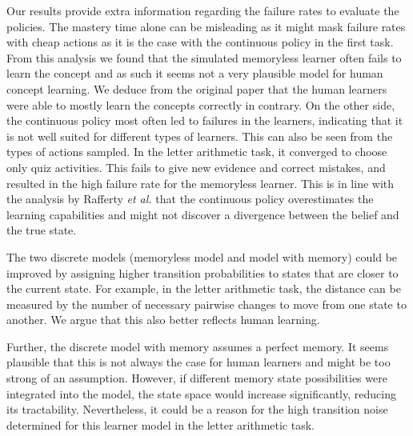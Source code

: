 Our results provide extra information regarding the failure rates to evaluate the policies.
The mastery time alone can be misleading as it might mask failure rates with cheap actions as it is the case with the continuous policy in the first task. 
From this analysis we found that the simulated memoryless learner often fails to learn the concept and as such it seems not a very plausible model for human concept learning. We deduce from the original paper that the human learners were able to mostly learn the concepts correctly in contrary.
On the other side, the continuous policy most often led to failures in the learners, indicating that it is not well suited for different types of learners.
This can also be seen from the types of actions sampled. In the letter arithmetic task, it converged to choose only quiz activities. This fails to give new evidence and correct mistakes, and resulted in the high failure rate for the memoryless learner.
This is in line with the analysis by Rafferty \textit{et al.} that the continuous policy overestimates the learning capabilities and might not discover a divergence between the belief and the true state.

The two discrete models (memoryless model and model with memory) could be improved by assigning higher transition probabilities to states that are closer to the current state.
For example, in the letter arithmetic task, the distance can be measured by the number of necessary pairwise changes to move from one state to another. 
We argue that this also better reflects human learning. 

Further, the discrete model with memory assumes a perfect memory. 
It seems plausible that this is not always the case for human learners and might be too strong of an assumption. 
However, if different memory state possibilities were integrated into the model, the state space would increase significantly, reducing its tractability. 
Nevertheless, it could be a reason for the high transition noise determined for this learner model in the letter arithmetic task.


